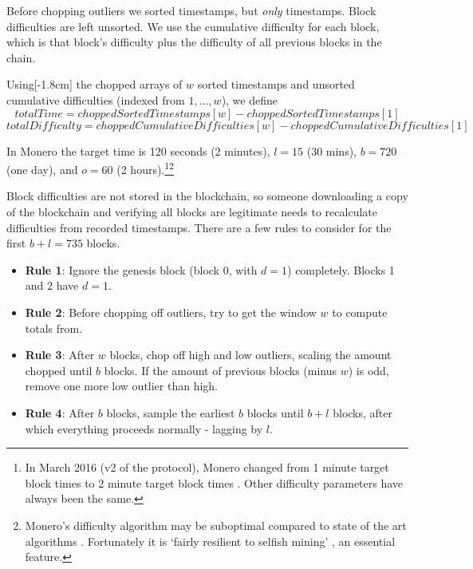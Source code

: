 Before chopping outliers we sorted timestamps, but {\em only} timestamps. Block difficulties are left unsorted. We use the cumulative difficulty for each block, which is that block's difficulty plus the difficulty of all previous blocks in the chain.

Using[-1.8cm] the chopped arrays of $w$ sorted timestamps and unsorted cumulative difficulties (indexed from $1,...,w$), we define
\[ \mathit{totalTime} = \mathit{choppedSortedTimestamps}[w] - \mathit{choppedSortedTimestamps}[1]\]
\[ \mathit{totalDifficulty} = \mathit{choppedCumulativeDifficulties}[w] - \mathit{choppedCumulativeDifficulties}[1]\]

In Monero the target time is 120 seconds (2 minutes), $l = 15$ (30 mins), $b = 720$ (one day), and $o = 60$ (2 hours).\footnote{In March 2016 (v2 of the protocol), Monero changed from 1 minute target block times to 2 minute target block times \cite{monero-0.9.3}. Other difficulty parameters have always been the same.}\footnote{Monero's difficulty algorithm may be suboptimal compared to state of the art algorithms \cite{difficuly-algorithm-summary}. Fortunately it is `fairly resilient to selfish mining' \cite{selfish-miner-profitability-algorithm-analysis}, an essential feature.}

Block difficulties are not stored in the blockchain, so someone downloading a copy of the blockchain and verifying all blocks are legitimate needs to recalculate difficulties from recorded timestamps. There are a few rules to consider for the first $b+l = 735$ blocks.

\begin{itemize}
    \item[] \textbf{Rule 1}: Ignore the genesis block (block 0, with $d = 1$) completely. Blocks 1 and 2 have $d = 1$.
    \item[] \textbf{Rule 2}: Before chopping off outliers, try to get the window $w$ to compute totals from.
    \item[] \textbf{Rule 3}: After $w$ blocks, chop off high and low outliers, scaling the amount chopped until $b$ blocks. If the amount of previous blocks (minus $w$) is odd, remove one more low outlier than high.
    \item[] \textbf{Rule 4}: After $b$ blocks, sample the earliest $b$ blocks until $b+l$ blocks, after which everything proceeds normally - lagging by $l$.
\end{itemize}


